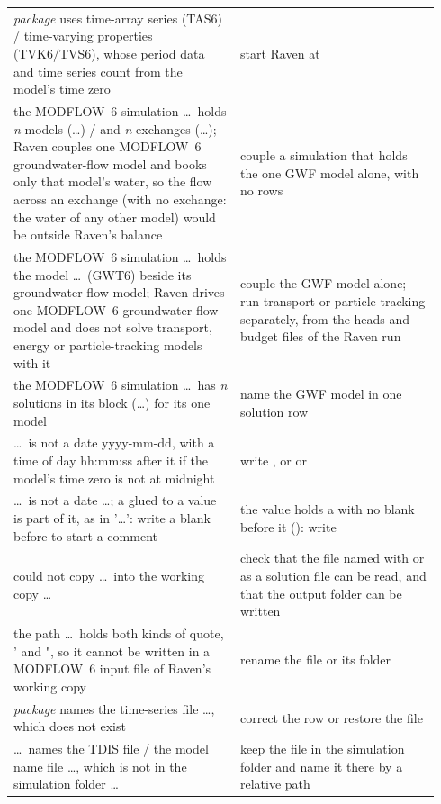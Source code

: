 \begin{longtable}{P{0.5\linewidth}P{0.44\linewidth}}
\emph{package} uses time-array series (TAS6) / time-varying properties (TVK6/TVS6), whose period data and time series count from the model's time zero & start Raven at \\
the MODFLOW~6 simulation \dots\ holds \emph{n} models (\dots) / and \emph{n} exchanges (\dots); Raven couples one MODFLOW~6 groundwater-flow model and books only that model's water, so the flow across an exchange (with no exchange: the water of any other model) would be outside Raven's balance & couple a simulation that holds the one GWF model alone, with no  rows\\
the MODFLOW~6 simulation \dots\ holds the model \dots\ (GWT6) beside its groundwater-flow model; Raven drives one MODFLOW~6 groundwater-flow model and does not solve transport, energy or particle-tracking models with it & couple the GWF model alone; run transport or particle tracking separately, from the heads and budget files of the Raven run\\
the MODFLOW~6 simulation \dots\ has \emph{n} solutions in its  block (\dots) for its one model & name the GWF model in one solution row\\
 \dots\ is not a date yyyy-mm-dd, with a time of day hh:mm:ss after it if the model's time zero is not at midnight & write , or  or \\
 \dots\ is not a date \dots; a \cmd{\#} glued to a value is part of it, as in '\dots': write a blank before \cmd{\#} to start a comment & the value holds a \cmd{\#} with no blank before it (): write \\
could not copy \dots\ into the working copy \dots & check that the file named with  or as a solution file can be read, and that the output folder can be written\\
the path \dots\ holds both kinds of quote, ' and ", so it cannot be written in a MODFLOW~6 input file of Raven's working copy & rename the file or its folder\\
\emph{package} names the time-series file \dots, which does not exist & correct the  row or restore the file\\
\dots\ names the TDIS file / the model name file \dots, which is not in the simulation folder \dots & keep the file in the simulation folder and name it there by a relative path\\

\end{longtable}
